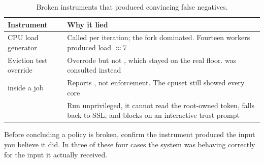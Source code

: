 \begin{table}[H]
\centering
\begin{tabularx}{\textwidth}{L{0.30\textwidth} Y}
\toprule
\textbf{Instrument} & \textbf{Why it lied} \\
\midrule
CPU load generator & Called  per iteration; the fork dominated. Fourteen workers produced load $\approx$7 \\
Eviction test override & Overrode  but not , which stayed on the real floor.  was consulted instead \\
 inside a job & Reports , not enforcement. The cpuset still showed every core \\
 & Run unprivileged, it cannot read the root-owned token, falls back to SSL, and blocks on an interactive trust prompt \\
\bottomrule
\end{tabularx}
\caption{Broken instruments that produced convincing false negatives.}
\end{table}

\begin{keypoint}
Before concluding a policy is broken, confirm the instrument produced the input
you believe it did. In three of these four cases the system was behaving
correctly for the input it actually received.
\end{keypoint}

